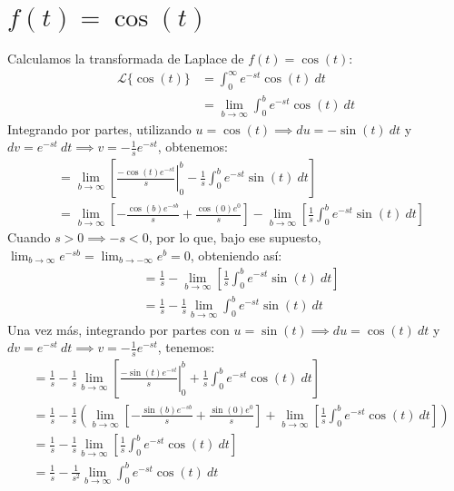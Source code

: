 \documentclass[12pt, a4paper]{article}
\begin{document}
\setcounter{section}{7}
\section{\texorpdfstring{\(f(t)=\cos(t)\)}{f (t) = cos (t)}}

Calculamos la transformada de Laplace de \(f(t) = \cos(t)\):
\begin{align*}
	\mathcal{L}\{\cos (t)\} &= \int_{0}^{\infty} e^{-st} \cos(t)\ dt \\
	&= \lim_{b \to \infty} \int_{0}^{b} e^{-st} \cos(t)\ dt
\end{align*}
Integrando por partes, utilizando \(u = \cos(t) \implies du = -\sin(t)\ dt\) y \(dv = e^{-st}\ dt \implies v = -\frac{1}{s} e^{-st}\), obtenemos:
\begin{align*}
	&= \lim_{b \to \infty} \left[ \left. \frac{-\cos (t) e^{-st}}{s} \right|_{0}^{b} - \frac{1}{s} \int_{0}^{b} e^{-st} \sin (t) \ dt \right] \\
	&= \lim_{b \to \infty} \left[ - \frac{\cos (b) e^{-sb}}{s} + \frac{\cos (0) e^{0}}{s} \right] - \lim_{b \to \infty} \left[ \frac{1}{s} \int_{0}^{b} e^{-st} \sin (t) \ dt \right]
\end{align*}
Cuando \(s > 0 \implies -s < 0\), por lo que, bajo ese supuesto, \(\lim_{b \to \infty} e^{-sb} = \lim_{b \to -\infty} e^{b} = 0\), obteniendo así:
\begin{align*}
	&= \frac{1}{s} - \lim_{b \to \infty} \left[ \frac{1}{s} \int_{0}^{b} e^{-st} \sin (t) \ dt \right] \\
	&= \frac{1}{s} - \frac{1}{s} \lim_{b \to \infty} \int_{0}^{b} e^{-st} \sin (t) \ dt
\end{align*}
Una vez más, integrando por partes con \(u = \sin (t) \implies du = \cos (t)\ dt\) y \(dv = e^{-st}\ dt \implies v = -\frac{1}{s} e^{-st}\), tenemos:
\begin{align*}
	&= \frac{1}{s} - \frac{1}{s} \lim_{b \to \infty} \left[ \left. \frac{-\sin (t) e^{-st}}{s} \right|_{0}^{b} + \frac{1}{s} \int_{0}^{b} e^{-st} \cos (t)\ dt \right] \\
	&= \frac{1}{s} - \frac{1}{s} \left( \lim_{b \to \infty} \left[ - \frac{\sin (b) e^{-sb}}{s} + \frac{\sin (0) e^{0}}{s} \right] + \lim_{b \to \infty} \left[ \frac{1}{s} \int_{0}^{b} e^{-st} \cos (t)\ dt \right] \right) \\
	&= \frac{1}{s} - \frac{1}{s} \lim_{b \to \infty} \left[ \frac{1}{s} \int_{0}^{b} e^{-st} \cos (t)\ dt \right] \\
	&= \frac{1}{s} - \frac{1}{s^{2}} \lim_{b \to \infty} \int_{0}^{b} e^{-st} \cos (t) \ dt
\end{align*}
\end{document}
